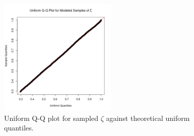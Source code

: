 \documentclass[12pt]{article}
\begin{document}
%
\begin{figure}[h!]
\includegraphics[width=0.5\textwidth]{../gpBias/qqUnif.png}
\caption{Uniform Q-Q plot for sampled $\zeta$ against theoretical uniform quantiles.}
\end{figure}
\end{document}
